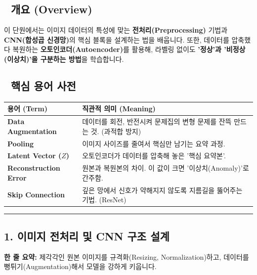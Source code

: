 \documentclass[11pt,a4paper]{book}
\theoremstyle{definition}
\begin{document}
\subsection*{📌 개요 (Overview)}
이 단원에서는 이미지 데이터의 특성에 맞는 \textbf{전처리(Preprocessing)} 기법과 \textbf{CNN(합성곱 신경망)}의 핵심 블록을 설계하는 법을 배웁니다. 또한, 데이터를 압축했다 복원하는 \textbf{오토인코더(Autoencoder)}를 활용해, 라벨링 없이도 \textbf{'정상'과 '비정상(이상치)'을 구분하는 방법}을 학습합니다.

\subsection*{📝 핵심 용어 사전}
\begin{table}[h]
\centering
\begin{tabularx}{\textwidth}{|p{}|X|}
\hline
\textbf{용어 (Term)} & \textbf{직관적 의미 (Meaning)} \\
\hline
\textbf{Data Augmentation} & 데이터를 회전, 반전시켜 문제집의 변형 문제를 잔뜩 만드는 것. (과적합 방지) \\
\hline
\textbf{Pooling} & 이미지 사이즈를 줄여서 핵심만 남기는 요약 과정. \\
\hline
\textbf{Latent Vector ($Z$)} & 오토인코더가 데이터를 압축해 놓은 '핵심 요약본'. \\
\hline
\textbf{Reconstruction Error} & 원본과 복원본의 차이. 이 값이 크면 '이상치(Anomaly)'로 간주함. \\
\hline
\textbf{Skip Connection} & 깊은 망에서 신호가 약해지지 않도록 지름길을 뚫어주는 기법. (ResNet) \\
\hline
\end{tabularx}
\end{table}

\vspace{0.5cm}\hrule\vspace{0.5cm}

\subsection{1. 이미지 전처리 및 CNN 구조 설계}

\begin{conceptbox}[title={개념 1: AI가 보기 좋게 차려주기}]
\textbf{한 줄 요약:} 제각각인 원본 이미지를 규격화(Resizing, Normalization)하고, 데이터를 뻥튀기(Augmentation)해서 모델을 강하게 키웁니다.
\end{conceptbox}
\end{document}
